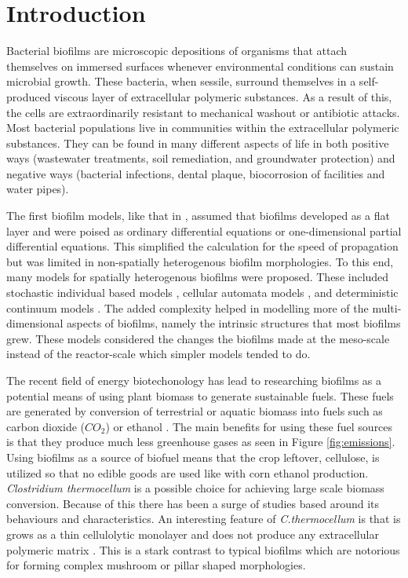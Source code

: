 \section{Introduction}

Bacterial biofilms are microscopic depositions of organisms that attach themselves on immersed surfaces whenever environmental conditions can sustain microbial growth.
These bacteria, when sessile, surround themselves in a self-produced viscous layer of extracellular polymeric substances.
As a result of this, the cells are extraordinarily resistant to mechanical washout or antibiotic attacks.
Most bacterial populations live in communities within the extracellular polymeric substances.
They can be found in many different aspects of life in both positive ways (wastewater treatments, soil remediation, and groundwater protection) and negative ways (bacterial infections, dental plaque, biocorrosion of facilities and water pipes).

The first biofilm models, like that in \cite{rittmann1980model}, assumed that biofilms developed as a flat layer and were poised as ordinary differential equations or one-dimensional partial differential equations.
This simplified the calculation for the speed of propagation but was limited in non-spatially heterogenous biofilm morphologies. %
To this end, many models for spatially heterogenous biofilms were proposed.
These included stochastic individual based models \citep{kreft2001individual}, cellular automata models \citep{picioreanu1998newCombined}, and deterministic continuum models \citep{eberl2001deterministic}. 
The added complexity helped in modelling more of the multi-dimensional aspects of biofilms, namely the intrinsic structures that most biofilms grew.
These models considered the changes the biofilms made at the meso-scale instead of the reactor-scale which simpler models tended to do.

The recent field of energy biotechonology has lead to researching biofilms as a potential means of using plant biomass to generate sustainable fuels. 
These fuels are generated by conversion of terrestrial or aquatic biomass into fuels such as carbon dioxide ($CO_2$) or ethanol \citep{lynd2008energy}. 
The main benefits for using these fuel sources is that they produce much less greenhouse gases as seen in Figure \ref{fig:emissions}.
Using biofilms as a source of biofuel means that the crop leftover, cellulose, is utilized so that no edible goods are used like with corn ethanol production.
\textit{Clostridium thermocellum} is a possible choice for achieving large scale biomass conversion. %
Because of this there has been a surge of studies based around its behaviours and characteristics.
An interesting feature of \textit{C.thermocellum} is that is grows as a thin cellulolytic monolayer and does not produce any extracellular polymeric matrix \citep{dumitrache2013formFunction}.
This is a stark contrast to typical biofilms which are notorious for forming complex mushroom or pillar shaped morphologies.

